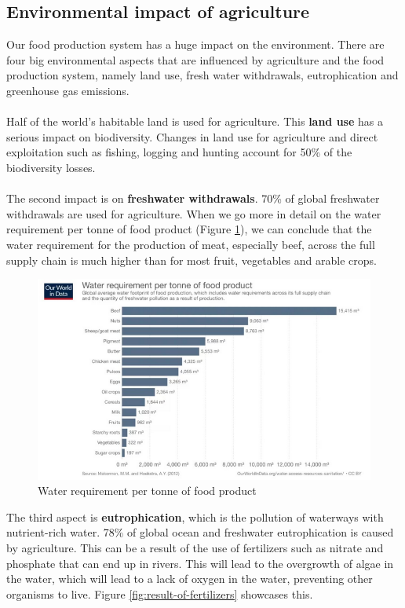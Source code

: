 \documentclass[../summary.tex]{subfiles}
\begin{document}
	\subsection{Environmental impact of agriculture}
	
	Our food production system has a huge impact on the environment. There are four big environmental aspects that are influenced by agriculture and the food production system, namely land use, fresh water withdrawals, eutrophication and greenhouse gas emissions.
	\\\\
	Half of the world’s habitable land is used for agriculture. This \textbf{land use} has a serious impact on biodiversity. Changes in land use for agriculture and direct exploitation such as fishing, logging and hunting account for 50\% of the biodiversity losses. 
	\\\\
	The second impact is on \textbf{freshwater withdrawals}. 70\% of global freshwater withdrawals are used for agriculture. When we go more in detail on the water requirement per tonne of food product (Figure \ref{fig:production-water-requirement}), we can conclude that the water requirement for the production of meat, especially beef, across the full supply chain is much higher than for most fruit, vegetables and arable crops.
	\\
	
	\begin{figure} [htbp]
		\centering
		\includegraphics[width=1\linewidth]{images/6-product-water-requirement.png}
		\caption{Water requirement per tonne of food product}
		\label{fig:production-water-requirement}
	\end{figure}
	
	The third aspect is \textbf{eutrophication}, which is the pollution of waterways with nutrient-rich water. 78\% of global ocean and freshwater eutrophication is caused by agriculture. This can be a result of the use of fertilizers such as nitrate and phosphate that can end up in rivers. This will lead to the overgrowth of algae in the water, which will lead to a lack of oxygen in the water, preventing other organisms to live. Figure \ref{fig:result-of-fertilizers} showcases this.
	
\end{document}
